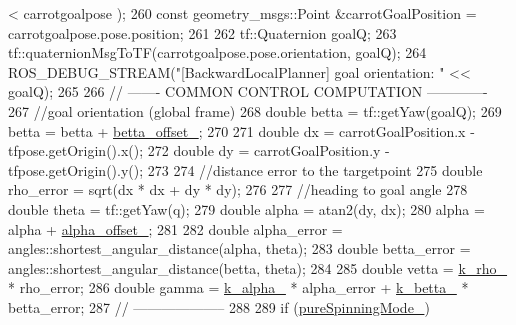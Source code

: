\begin{DoxyCode}
      < carrotgoalpose );
260                 \textcolor{keyword}{const} geometry\_msgs::Point &carrotGoalPosition = carrotgoalpose.pose.position;
261 
262                 tf::Quaternion goalQ;
263                 tf::quaternionMsgToTF(carrotgoalpose.pose.orientation, goalQ);
264                 ROS\_DEBUG\_STREAM(\textcolor{stringliteral}{"[BackwardLocalPlanner] goal orientation: "} << goalQ);
265 
266                 \textcolor{comment}{// ------- COMMON CONTROL COMPUTATION -------------}
267                 \textcolor{comment}{//goal orientation (global frame)}
268                 \textcolor{keywordtype}{double} betta = tf::getYaw(goalQ);
269                 betta = betta + \hyperlink{classcl__move__base__z_1_1backward__local__planner_1_1BackwardLocalPlanner_a07e5f16f6951cca1e6d3483f345d0bb1}{betta\_offset\_};
270 
271                 \textcolor{keywordtype}{double} dx = carrotGoalPosition.x - tfpose.getOrigin().x();
272                 \textcolor{keywordtype}{double} dy = carrotGoalPosition.y - tfpose.getOrigin().y();
273 
274                 \textcolor{comment}{//distance error to the targetpoint}
275                 \textcolor{keywordtype}{double} rho\_error = sqrt(dx * dx + dy * dy);
276 
277                 \textcolor{comment}{//heading to goal angle}
278                 \textcolor{keywordtype}{double} theta = tf::getYaw(q);
279                 \textcolor{keywordtype}{double} alpha = atan2(dy, dx);
280                 alpha = alpha + \hyperlink{classcl__move__base__z_1_1backward__local__planner_1_1BackwardLocalPlanner_a09765b08935d9355447c44776e1b1c3a}{alpha\_offset\_};
281 
282                 \textcolor{keywordtype}{double} alpha\_error = angles::shortest\_angular\_distance(alpha, theta);
283                 \textcolor{keywordtype}{double} betta\_error = angles::shortest\_angular\_distance(betta, theta);
284 
285                 \textcolor{keywordtype}{double} vetta = \hyperlink{classcl__move__base__z_1_1backward__local__planner_1_1BackwardLocalPlanner_ad8a36184bfb011545c751109e23d3b98}{k\_rho\_} * rho\_error;
286                 \textcolor{keywordtype}{double} gamma = \hyperlink{classcl__move__base__z_1_1backward__local__planner_1_1BackwardLocalPlanner_abf7a5a56de2ee41afba7e63c0628ec35}{k\_alpha\_} * alpha\_error + \hyperlink{classcl__move__base__z_1_1backward__local__planner_1_1BackwardLocalPlanner_a9f257183d87f1d732cb7e404f09905ad}{k\_betta\_} * betta\_error;
287                 \textcolor{comment}{// --------------------}
288 
289                 \textcolor{keywordflow}{if} (\hyperlink{classcl__move__base__z_1_1backward__local__planner_1_1BackwardLocalPlanner_aebc89ccfa79fdf6bd45ba35134bec3fb}{pureSpinningMode\_})

\end{DoxyCode}
